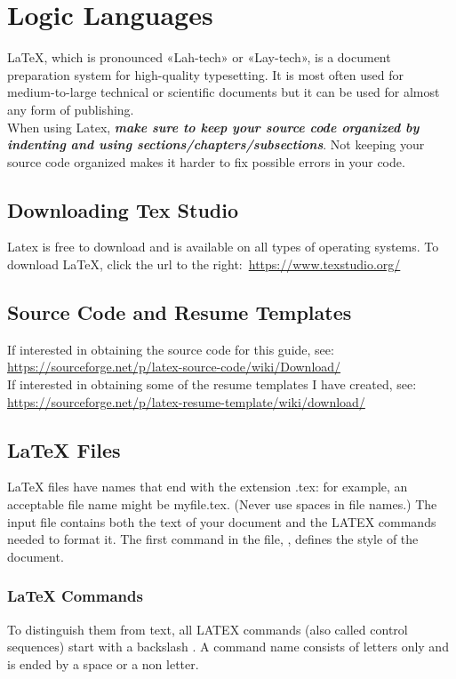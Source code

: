 \section{Logic Languages}
\vspace{10.5cm}
	LaTeX, which is pronounced «Lah-tech» or «Lay-tech», is a document preparation system for high-quality typesetting. It is most often used for medium-to-large technical or scientific documents but it can be used for almost any form of publishing.\\
	When using Latex, \textbf{\emph{make sure to keep your source code organized by indenting and using sections/chapters/subsections}}. Not keeping your source code organized makes it harder to fix possible errors in your code.
	\subsection{Downloading Tex Studio}
			Latex is free to download and is available on all types of operating systems. To download \LaTeX, click the url to the right:\, \url{https://www.texstudio.org/}
	\subsection{Source Code and Resume Templates}
			If interested in obtaining the source code for this guide, see:\\
			\url{https://sourceforge.net/p/latex-source-code/wiki/Download/}\\
			If interested in obtaining some of the resume templates I have created, see:\\ \url{https://sourceforge.net/p/latex-resume-template/wiki/download/}
	\subsection{LaTeX Files}
			LaTeX files have names that end with the extension .tex: for example, an acceptable file name might be myfile.tex. (Never use spaces in file names.) The input file contains both the text of your document and the LATEX commands needed to format it. The first command in the file, , defines the style of the document.
	\subsubsection{LaTeX Commands}
			To distinguish them from text, all LATEX commands (also called control sequences) start with a backslash \cs. A command name consists of letters only and is ended by a space or a non letter.
